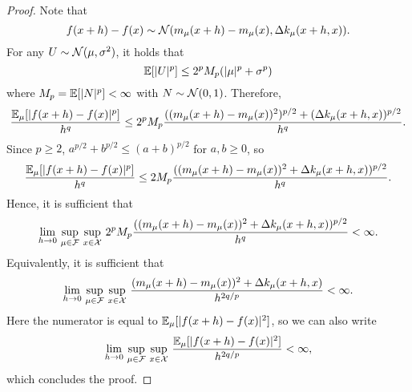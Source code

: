 \documentclass[12pt]{report}
\begin{document}
\begin{proof}
    Note that
    \begin{equation}
        f(x + h) - f(x)
        \sim \mathcal{N}(m_\mu(x + h) - m_\mu(x), \Delta k_\mu(x + h, x)).
    \end{equation}
    For any $U \sim \mathcal{N}(\mu, \sigma^2)$, it holds that
    \begin{equation}
        \mathbb{E}[\lvert U\rvert^p]
        \le 2^{p} M_p (\lvert\mu\rvert^p + \sigma^{p})
    \end{equation}
    where $M_p = \mathbb{E}[\lvert N\rvert^p] < \infty$ with $N \sim \mathcal{N}(0, 1)$.
    Therefore,
    \begin{equation}
        \frac{\mathbb{E}_\mu[\lvert f(x + h) - f(x)\rvert^p]}{h^q}
        \le
        2^p M_p \frac{((m_\mu(x + h) - m_\mu(x))^2)^{p/2} + (\Delta k_\mu(x + h, x))^{p/2}}{h^q}.
    \end{equation}
    Since $p \ge 2$, $a^{p/2} + b^{p/2} \le (a + b)^{p/2}$ for $a, b \ge 0$, so
    \begin{equation}
        \frac{\mathbb{E}_\mu[\lvert f(x + h) - f(x)\rvert^p]}{h^q}
        \le
        2 M_p\frac{ ((m_\mu(x + h) - m_\mu(x))^2 + \Delta k_\mu(x + h, x))^{p/2}}{h^q}.
    \end{equation}
    Hence, it is sufficient that
    \begin{equation}
        \lim_{h \to 0}\,
        \operatorname*{sup}_{\mu \in \mathcal{F}}\,
        \operatorname*{sup}_{x \in \mathcal{X}}\,
        2^p M_p
        \frac{((m_\mu(x + h) - m_\mu(x))^2 + \Delta k_\mu(x + h, x))^{p/2}}{h^q}
        < \infty.
    \end{equation}
    Equivalently, it is sufficient that
    \begin{equation}
        \lim_{h \to 0}\,
        \operatorname*{sup}_{\mu \in \mathcal{F}}\,
        \operatorname*{sup}_{x \in \mathcal{X}}\,
        \frac{(m_\mu(x + h) - m_\mu(x))^2 + \Delta k_\mu(x + h, x)}{h^{2q/p}}
        < \infty.
    \end{equation}
    Here the numerator is equal to $\mathbb{E}_\mu[\lvert f(x + h) - f(x)\rvert^2]$, so we can also write
    \begin{equation}
        \lim_{h \to 0}\,
        \operatorname*{sup}_{\mu \in \mathcal{F}}\,
        \operatorname*{sup}_{x \in \mathcal{X}}\,
        \frac{\mathbb{E}_\mu[\lvert f(x + h) - f(x)\rvert^2]}{h^{2q/p}}
        < \infty,
    \end{equation}
    which concludes the proof.
\end{proof}
\end{document}
